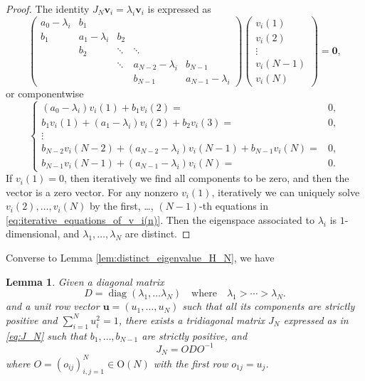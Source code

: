 \documentclass[11pt, a4paper]{article}
\numberwithin{equation}{section}
\newcommand{\Orthogonal}{\mathrm{O}}
\renewcommand{\vec}[1]{\mathbf{#1}}
\DeclareMathOperator{\diag}{diag}
\newtheorem{lem}{Lemma}
\theoremstyle{definition}
\theoremstyle{remark}
\begin{document}
\begin{proof}
  The identity $J_N  \vec{v}_i = \lambda_i \vec{v}_i$ is expressed as
  \begin{equation}
    \begin{pmatrix}
      a_0 - \lambda_i & b_1 & & & \\
      b_1 & a_1 - \lambda_i & b_2 & & \\
       & b_2 & \ddots & \ddots & \\
       & & \ddots & a_{N - 2} - \lambda_i & b_{N - 1} \\
       & & & b_{N - 1} & a_{N - 1} - \lambda_i 
    \end{pmatrix}
    \begin{pmatrix}
      v_i(1) \\
      v_i(2) \\
      \vdots \\
      v_i(N - 1) \\
      v_i(N)
    \end{pmatrix}
    = \vec{0},
  \end{equation}
  or componentwise
  \begin{equation} \label{eq:iterative_equations_of_v_i(n)}
    \left\{
      \begin{aligned}
        (a_0 - \lambda_i) v_i(1) + b_1 v_i(2) = {}& 0, \\
        b_1 v_i(1) + (a_1 - \lambda_i) v_i(2) + b_2 v_i(3) = {}& 0, \\
        \vdots & \\
        b_{N - 2} v_i(N - 2) + (a_{N - 2} - \lambda_i) v_i(N - 1) + b_{N - 1} v_i(N) = {}& 0, \\
        b_{N - 1} v_i(N - 1) + (a_{N - 1} - \lambda_i) v_i(N) = {}& 0.
      \end{aligned}
    \right.
  \end{equation}
  If $v_i(1) = 0$, then iteratively we find all components to be zero, and then the vector is a zero vector. For any nonzero $v_i(1)$, iteratively we can uniquely solve $v_i(2), \dotsc, v_i(N)$ by the first, \dots, $(N - 1)$-th equations in \eqref{eq:iterative_equations_of_v_i(n)}. Then the eigenspace associated to $\lambda_i$ is $1$-dimensional, and $\lambda_1, \dotsc, \lambda_N$ are distinct.
\end{proof}
Converse to Lemma \ref{lem:distinct_eigenvalue_H_N}, we have
\begin{lem} \label{lem:distinct_eigenvalue_H_N_reverse}
  Given a diagonal matrix
  \begin{equation} \label{eq:diagonal_related_to_H_N}
    D = \diag(\lambda_1, \dots \lambda_N) \quad \text{where} \quad \lambda_1 > \dotsb > \lambda_N.
  \end{equation}
  and a unit row vector $\vec{u} = (u_1, \dotsc, u_N)$ such that all its components are strictly positive and $\sum^N_{i = 1} u^2_i = 1$, there exists a tridiagonal matrix $J_N$ expressed as in \eqref{eq:J_N} such that $b_1, \dotsc, b_{N - 1}$ are strictly positive, and
  \begin{equation}
    J_N = O D O^{-1}
  \end{equation}
  where $O = (o_{ij})^N_{i, j = 1} \in \Orthogonal(N)$ with the first row $o_{1j} = u_j$. 
\end{lem}
\end{document}
